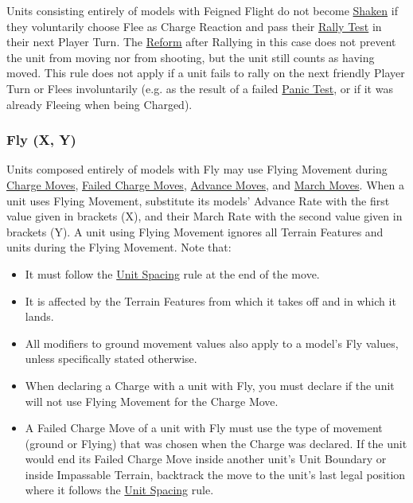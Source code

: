 Units consisting entirely of models with Feigned Flight do not become \hyperref[shaken]{Shaken} if they voluntarily choose Flee as Charge Reaction and pass their \hyperref[rally_fleeing_units]{Rally Test} in their next Player Turn. The \hyperref[reform]{Reform} after Rallying in this case does not prevent the unit from moving nor from shooting, but the unit still counts as having moved. This rule does not apply if a unit fails to rally on the next friendly Player Turn or Flees involuntarily (e.g. as the result of a failed \hyperref[panic_test]{Panic Test}, or if it was already Fleeing when being Charged).

\subsubsection{Fly (X, Y)}
\idx[main=y]{\fly{}{}}\label{fly}

Units composed entirely of models with Fly may use Flying Movement during \hyperref[charge_move]{Charge Moves}, \hyperref[failed_charge]{Failed Charge Moves}, \hyperref[advance_move]{Advance Moves}, and \hyperref[march_move]{March Moves}. When a unit uses Flying Movement, substitute its models' Advance Rate with the first value given in brackets (X), and their March Rate with the second value given in brackets (Y). A unit using Flying Movement ignores all Terrain Features and units during the Flying Movement. Note that:

\begin{itemize}
\item It must follow the \hyperref[unit_spacing]{Unit Spacing} rule at the end of the move.
\item It is affected by the Terrain Features from which it takes off and in which it lands.
\item All modifiers to ground movement values also apply to a model's Fly values, unless specifically stated otherwise.
\item When declaring a Charge with a unit with Fly, you must declare if the unit will not use Flying Movement for the Charge Move.
\item A Failed Charge Move of a unit with Fly must use the type of movement (ground or Flying) that was chosen when the Charge was declared. If the unit would end its Failed Charge Move inside another unit's Unit Boundary or inside Impassable Terrain, backtrack the move to the unit’s last legal position where it follows the \hyperref[unit_spacing]{Unit Spacing} rule.
\end{itemize}

